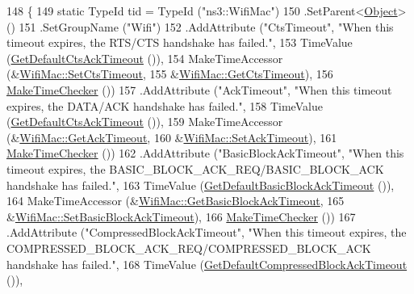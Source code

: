 \begin{DoxyCode}
148 \{
149   \textcolor{keyword}{static} TypeId tid = TypeId (\textcolor{stringliteral}{"ns3::WifiMac"})
150     .SetParent<\hyperlink{classns3_1_1Object_a40860402e64d8008fb42329df7097cdb}{Object}> ()
151     .SetGroupName (\textcolor{stringliteral}{"Wifi"})
152     .AddAttribute (\textcolor{stringliteral}{"CtsTimeout"}, \textcolor{stringliteral}{"When this timeout expires, the RTS/CTS handshake has failed."},
153                    TimeValue (\hyperlink{classns3_1_1WifiMac_a4134e0fdfcdff8767412bb4abd63bdda}{GetDefaultCtsAckTimeout} ()),
154                    MakeTimeAccessor (&\hyperlink{classns3_1_1WifiMac_af803f882030d1b367407af43f82d8c13}{WifiMac::SetCtsTimeout},
155                                      &\hyperlink{classns3_1_1WifiMac_ab33eb66bc4a3c40cd48c38e9dc7cd3ee}{WifiMac::GetCtsTimeout}),
156                    \hyperlink{group__time_ga7032965bd4afa578691d88c09e4481c1}{MakeTimeChecker} ())
157     .AddAttribute (\textcolor{stringliteral}{"AckTimeout"}, \textcolor{stringliteral}{"When this timeout expires, the DATA/ACK handshake has failed."},
158                    TimeValue (\hyperlink{classns3_1_1WifiMac_a4134e0fdfcdff8767412bb4abd63bdda}{GetDefaultCtsAckTimeout} ()),
159                    MakeTimeAccessor (&\hyperlink{classns3_1_1WifiMac_a1a3e7634a7afef9741d253871ec93a7d}{WifiMac::GetAckTimeout},
160                                      &\hyperlink{classns3_1_1WifiMac_a42c8acb7dec6b7f9d01d568fd21f2e3e}{WifiMac::SetAckTimeout}),
161                    \hyperlink{group__time_ga7032965bd4afa578691d88c09e4481c1}{MakeTimeChecker} ())
162     .AddAttribute (\textcolor{stringliteral}{"BasicBlockAckTimeout"}, \textcolor{stringliteral}{"When this timeout expires, the
       BASIC\_BLOCK\_ACK\_REQ/BASIC\_BLOCK\_ACK handshake has failed."},
163                    TimeValue (\hyperlink{classns3_1_1WifiMac_ad2ad0806bee4cb0c4ced1fd541a8032e}{GetDefaultBasicBlockAckTimeout} ()),
164                    MakeTimeAccessor (&\hyperlink{classns3_1_1WifiMac_aba734e2f1a0ed6ec557830d863e2077b}{WifiMac::GetBasicBlockAckTimeout},
165                                      &\hyperlink{classns3_1_1WifiMac_a77f3d5d77174ab4208e773adb504de3b}{WifiMac::SetBasicBlockAckTimeout}),
166                    \hyperlink{group__time_ga7032965bd4afa578691d88c09e4481c1}{MakeTimeChecker} ())
167     .AddAttribute (\textcolor{stringliteral}{"CompressedBlockAckTimeout"}, \textcolor{stringliteral}{"When this timeout expires, the
       COMPRESSED\_BLOCK\_ACK\_REQ/COMPRESSED\_BLOCK\_ACK handshake has failed."},
168                    TimeValue (\hyperlink{classns3_1_1WifiMac_ade1ea0a5c8c41dbb2e8678696e8ec1ae}{GetDefaultCompressedBlockAckTimeout} ()),

\end{DoxyCode}
